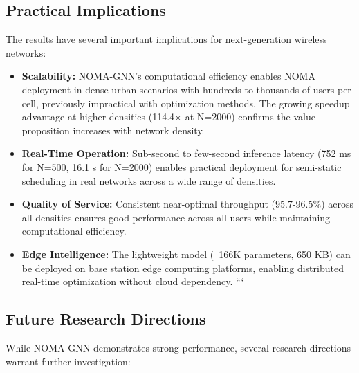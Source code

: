\subsection{Practical Implications}

The results have several important implications for next-generation wireless networks:

\begin{itemize}
    \item \textbf{Scalability:} NOMA-GNN's computational efficiency enables NOMA deployment in dense urban scenarios with hundreds to thousands of users per cell, previously impractical with optimization methods. The growing speedup advantage at higher densities (114.4× at N=2000) confirms the value proposition increases with network density.
    
    \item \textbf{Real-Time Operation:} Sub-second to few-second inference latency (752 ms for N=500, 16.1 s for N=2000) enables practical deployment for semi-static scheduling in real networks across a wide range of densities.
    
    \item \textbf{Quality of Service:} Consistent near-optimal throughput (95.7-96.5\%) across all densities ensures good performance across all users while maintaining computational efficiency.
    
    \item \textbf{Edge Intelligence:} The lightweight model (~166K parameters, 650 KB) can be deployed on base station edge computing platforms, enabling distributed real-time optimization without cloud dependency.
```
\end{itemize}

\subsection{Future Research Directions}

While NOMA-GNN demonstrates strong performance, several research directions warrant further investigation:


